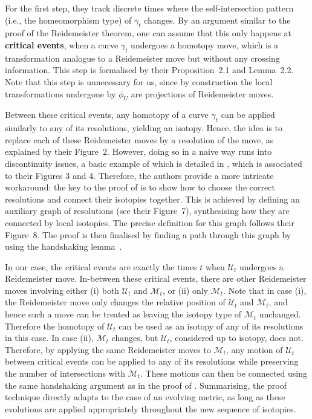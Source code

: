\documentclass[10pt,a4paper]{amsart}
\begin{document}
For the first step, they track discrete times where the self-intersection pattern (i.e., the homeomorphism type) of $\gamma_t$ changes. By an argument similar to the proof of the Reidemeister theorem, one can assume that this only happens at \textbf{critical events}, when a curve $\gamma_t$ undergoes a homotopy move, which is a transformation analogue to a Reidemeister move but without any crossing information. This step is formalised by their Proposition~2.1 and Lemma~2.2. Note that this step is unnecessary for us, since by construction the local transformations undergone by $\phi_U$ are projections of Reidemeister moves.

Between these critical events, any homotopy of a curve $\gamma_t$ can be applied similarly to any of its resolutions, yielding an isotopy. Hence, the idea is to replace each of these Reidemeister moves by a resolution of the move, as explained by their Figure~$2$. However, doing so in a naive way runs into discontinuity issues, a basic example of which is detailed in \cite[Example~2]{Chambers_homo-isotopy}, which is associated to their Figures $3$ and $4$. Therefore, the authors provide a more intricate workaround: the key to the proof of  is to show how to choose the correct resolutions and connect their isotopies together. This is achieved by defining an auxiliary graph of resolutions (see their Figure~7), synthesising how they are connected by local isotopies. The precise definition for this graph follows their Figure~8. The proof is then finalised by finding a path through this graph by using the handshaking lemma~\cite{Euler_bridges}. 

In our case, the critical events are exactly the times $t$ when $\mathcal{U}_t$ undergoes a Reidemeister move. In-between these critical events, there are other Reidemeister moves involving either (i) both $\mathcal{U}_t$ and $\mathcal{M}_t$, or (ii) only $\mathcal{M}_t$. Note that in case (i), the Reidemeister move only changes the relative position of $\mathcal{U}_t$ and $\mathcal{M}_t$, and hence such a move can be treated as leaving the isotopy type of $\mathcal{M}_t$ unchanged. Therefore the homotopy of $\mathcal{U}_t$ can be used as an isotopy of any of its resolutions in this case. In case (ii), $\mathcal{M}_t$ changes, but $\mathcal{U}_t$, considered up to isotopy, does not. Therefore, by applying the same Reidemeister moves to $\mathcal{M}_t$, any motion of $\mathcal{U}_t$ between critical events can be applied to any of its resolutions while preserving the number of intersections with $\mathcal{M}_t$. These motions can then be connected using the same handshaking argument as in the proof of . Summarising, the proof technique directly adapts to the case of an evolving metric, as long as these evolutions are applied appropriately throughout the new sequence of isotopies.
\end{document}
